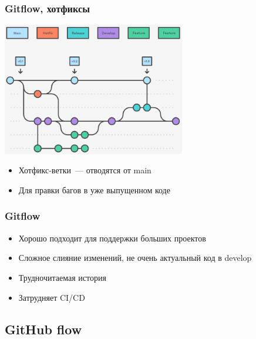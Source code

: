 \documentclass{../../slides-style}
\begin{document}
    \begin{frame}
        \frametitle{Gitflow, хотфиксы}
        \begin{center}
            \includegraphics[width=0.6\textwidth]{gitflow4.png}
        \end{center}
        \begin{itemize}
            \item Хотфикс-ветки~--- отводятся от main
            \item Для правки багов в уже выпущенном коде
        \end{itemize}
    \end{frame}

    \begin{frame}
        \frametitle{Gitflow}
        \begin{itemize}
            \item Хорошо подходит для поддержки больших проектов
            \item Сложное слияние изменений, не очень актуальный код в develop
            \item Трудночитаемая история
            \item Затрудняет CI/CD
        \end{itemize}
    \end{frame}

    \subsection{GitHub flow}
\end{document}
